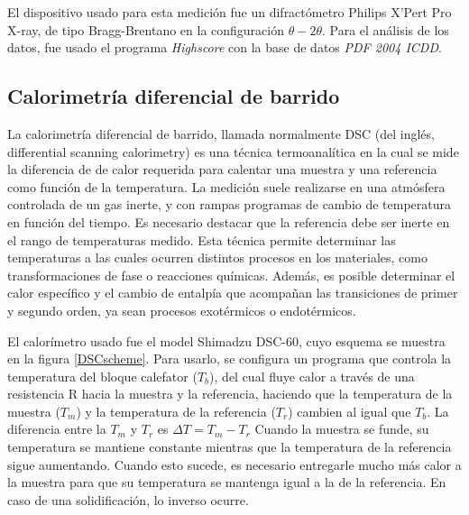 \documentclass{article}
\theoremstyle{definition}
\theoremstyle{remark}
\begin{document}
 El dispositivo usado para esta medición fue un difractómetro Philips X'Pert Pro X-ray, de tipo Bragg-Brentano en la configuración $\theta - 2\theta$.  Para el análisis de los datos, fue usado el programa \textit{Highscore} con la base de datos \textit{PDF 2004 ICDD}.
 
\subsection{Calorimetría diferencial de barrido}
La calorimetría diferencial de barrido, llamada normalmente DSC (del inglés, differential scanning calorimetry) es una técnica termoanalítica en la cual se mide la diferencia de de calor requerida para calentar una muestra y una referencia como función de la temperatura. La medición suele realizarse en una atmósfera controlada de un gas inerte, y con rampas programas de cambio de temperatura en función del tiempo.  Es necesario destacar que la referencia debe ser inerte en el rango de temperaturas medido.
Esta técnica permite determinar las temperaturas a las cuales ocurren distintos procesos en los materiales, como transformaciones de fase o reacciones químicas. Además, es posible determinar el calor específico y el cambio de entalpía que acompañan las transiciones de primer y segundo orden, ya sean procesos exotérmicos o endotérmicos.

El calorímetro usado fue el model Shimadzu DSC-60, cuyo esquema se muestra en la figura \ref{DSCscheme}. Para usarlo, se configura un programa que controla la temperatura del bloque calefator ($T_b$), del cual fluye calor a través de una resistencia R hacia la muestra y la referencia, haciendo que la temperatura de la muestra ($T_m$) y la temperatura de la referencia ($T_r$) cambien al igual que $T_b$. La diferencia entre la $T_m$ y $T_r$ es $\Delta T = T_m - T_r$
Cuando la muestra se funde, su temperatura se mantiene constante mientras que la temperatura de la referencia sigue aumentando. Cuando esto sucede, es necesario entregarle mucho más calor a la muestra para que su temperatura se mantenga igual a la de la referencia. En caso de una solidificación, lo inverso ocurre.
\end{document}
